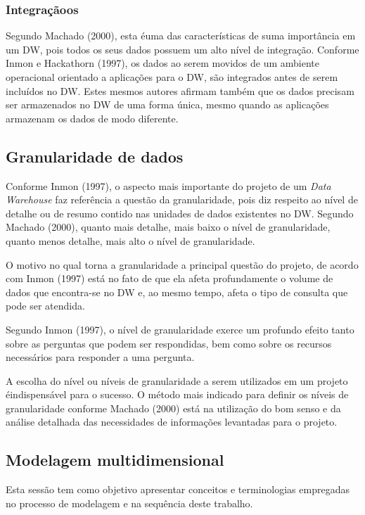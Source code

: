 \subsubsection{Integraçãoos}

Segundo Machado (2000), esta \'{e}uma das características de suma importância em um DW, pois todos os seus dados possuem um alto nível de integração.
Conforme Inmon e Hackathorn (1997), os dados ao serem movidos de um ambiente operacional orientado a aplicações para o DW, são integrados antes de serem incluídos no DW. Estes mesmos autores afirmam também que os dados precisam ser armazenados no DW de uma forma única, mesmo quando as aplicações armazenam os dados de modo diferente.

\subsection{Granularidade de dados}

Conforme Inmon (1997), o aspecto mais importante do projeto de um \textit{Data Warehouse} faz referência a questão da granularidade, pois diz respeito ao nível de detalhe ou de resumo contido nas unidades de dados existentes no DW. Segundo Machado (2000), quanto mais detalhe, mais baixo o nível de granularidade, quanto menos detalhe, mais alto o nível de granularidade.

O motivo no qual torna a granularidade a principal questão do projeto, de acordo com Inmon (1997) está no fato de que ela afeta profundamente o volume de dados que encontra-se no DW e, ao mesmo tempo, afeta o tipo de consulta que pode ser atendida.

Segundo Inmon (1997), o nível de granularidade exerce um profundo efeito tanto sobre as perguntas que podem ser respondidas, bem como sobre os recursos necessários para responder a uma pergunta.

A escolha do nível ou níveis de granularidade a serem utilizados em um projeto \'{e}indispensável para o sucesso. O método mais indicado para definir os níveis de granularidade conforme Machado (2000) está na utilização do bom senso e da análise detalhada das necessidades de informações levantadas para o projeto.
	
\subsection{Modelagem multidimensional}

Esta sessão tem como objetivo apresentar conceitos e terminologias empregadas no processo de modelagem e na sequência deste trabalho. 

